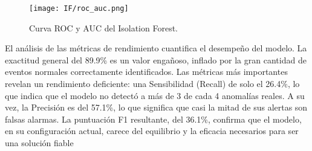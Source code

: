 \begin{figure}[ht!]
      \centering
      \texttt{[image: IF/roc\_auc.png]}
      \caption{Curva ROC y AUC del Isolation Forest.}
      \label{fig:roc_if}
\end{figure}

El análisis de las métricas de rendimiento cuantifica el desempeño del modelo. La exactitud general del 89.9\% es un valor engañoso, inflado por la gran cantidad de eventos normales correctamente identificados. Las métricas más importantes revelan un rendimiento deficiente: una Sensibilidad (Recall) de solo el 26.4\%, lo que indica que el modelo no detectó a más de 3 de cada 4 anomalías reales. A su vez, la Precisión es del 57.1\%, lo que significa que casi la mitad de sus alertas son falsas alarmas. La puntuación F1 resultante, del 36.1\%, confirma que el modelo, en su configuración actual, carece del equilibrio y la eficacia necesarios para ser una solución fiable
